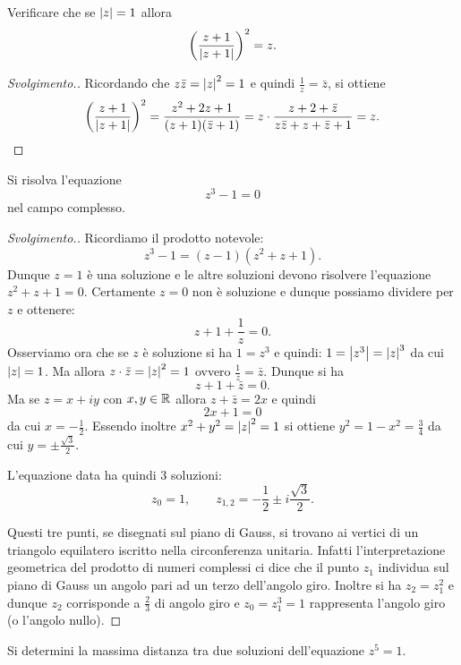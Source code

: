 \begin{exercise}[bisezione]
\label{ex:bisezione}
Verificare che se ${\left|z\right|}=1$ allora
\[
  {\left( \frac{z+1}{{\left|z+1\right|}} \right)}^2 = z. 
\]
\end{exercise}
\begin{proof}[Svolgimento.]
Ricordando che $z \bar z = {\left|z\right|}^2 = 1$ 
e quindi $\frac 1 z = \bar z$, si ottiene
\[
  {\left( \frac{z+1}{{\left|z+1\right|}} \right)}^2
  = \frac{z^2+2z+1}{(z+1)(\bar z+1)}
  = z\cdot \frac{z + 2 + \bar z} {z\bar z + z + \bar z + 1}
  =z.
\]
\end{proof}

\begin{exercise}
Si risolva l'equazione 
\[ 
 z^3 - 1 = 0
\]
nel campo complesso.
\end{exercise}
%
\begin{proof}[Svolgimento.]
Ricordiamo il prodotto notevole:
\[
  z^3 - 1 = (z-1)(z^2+z+1).
\]
Dunque $z=1$ è una soluzione e le altre soluzioni devono risolvere 
l'equazione $z^2+z+1=0$. 
Certamente $z=0$ non è soluzione e dunque possiamo dividere per $z$ 
e ottenere:
\[
  z + 1 + \frac 1 z = 0.
\]
Osserviamo ora che se $z$ è soluzione si ha $1=z^3$
e quindi: $1 = {\left|z^3\right|}= {\left|z\right|}^3$ da cui ${\left|z\right|} = 1$.
Ma allora $z\cdot \bar z = {\left|z\right|}^2 = 1$ ovvero $\frac 1 z = \bar z$.
Dunque si ha 
\[
    z + 1 + \bar z = 0.
\]
Ma se $z=x+iy$ con $x,y\in {\mathbb R}$ allora $z+\bar z = 2x$
e quindi 
\[
    2x + 1 = 0 
\]
da cui $x=-\frac 1 2$. Essendo inoltre $x^2+y^2={\left|z\right|}^2=1$ si ottiene
$y^2 = 1-x^2 = \frac 3 4$ da cui $y=\pm \frac{\sqrt 3}{2}$.

L'equazione data ha quindi $3$ soluzioni:
\[
z_0 = 1, \qquad 
z_{1,2} = -\frac 1 2 \pm i \frac{\sqrt 3} 2.
\]

Questi tre punti, se disegnati sul piano di Gauss, si trovano 
ai vertici di un triangolo equilatero iscritto nella circonferenza unitaria.
Infatti l'interpretazione geometrica del prodotto di numeri complessi ci dice 
che il punto $z_1$ individua sul piano di Gauss un angolo pari 
ad un terzo dell'angolo giro. Inoltre si ha $z_2 = z_1^2$ e dunque 
$z_2$ corrisponde a $\frac 2 3$ di angolo giro e $z_0=z_1^3 = 1$ rappresenta 
l'angolo giro (o l'angolo nullo).
\end{proof}

\begin{exercise}
Si determini la massima distanza tra due soluzioni 
dell'equazione $z^5=1$. 
\end{exercise}


